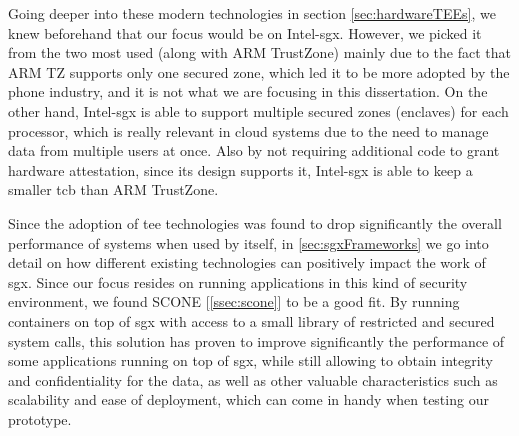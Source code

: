 Going deeper into these modern technologies in section \ref{sec:hardwareTEEs}, we knew beforehand that our focus would be on Intel-\gls{sgx}. However, we picked it from the two most used (along with ARM TrustZone) mainly due to the fact that ARM TZ supports only one secured zone, which led it to be more adopted by the phone industry, and it is not what we are focusing in this dissertation. On the other hand, Intel-\gls{sgx} is able to support multiple secured zones (enclaves) for each processor, which is really relevant in cloud systems due to the need to manage data from multiple users at once.
Also by not requiring additional code to grant hardware attestation, since its design supports it, Intel-\gls{sgx} is able to keep a smaller \gls{tcb} than ARM TrustZone.

Since the adoption of \gls{tee} technologies was found to drop significantly the overall performance of systems when used by itself, in \ref{sec:sgxFrameworks} we go into detail on how different existing technologies can positively impact the work of \gls{sgx}. Since our focus resides on running applications in this kind of security environment, we found SCONE [\ref{ssec:scone}] to be a good fit. By running containers on top of \gls{sgx} with access to a small library of restricted and secured system calls, this solution has proven to improve significantly the performance of some applications running on top of \gls{sgx}, while still allowing to obtain integrity and confidentiality for the data, as well as other valuable characteristics such as scalability and ease of deployment, which can come in handy when testing our prototype. 









